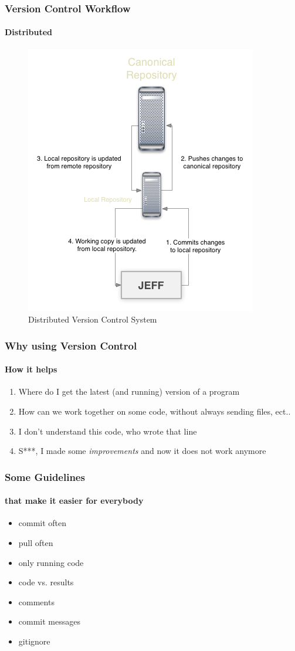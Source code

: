 \documentclass{beamer}
\begin{document}
\begin{frame}
    \frametitle{Version Control Workflow}
    \framesubtitle{Distributed}
    \begin{figure}[h]
        \centering
            \includegraphics[height=0.8\textheight]{dscm.png}
        \caption{Distributed Version Control System}
        \label{sg:fig:scm_simple}
    \end{figure}
\end{frame}


\begin{frame}
	\frametitle{Why using Version Control}
	\framesubtitle{How it helps}
	
	\begin{enumerate}
		\item<1-> Where do I get the latest (and running) version of a program
		\item<2-> How can we work together on some code, without always sending files, ect..
		\item<3-> I don't understand this code, who wrote that line
		\item<4-> S***, I made some \emph{improvements} and now it does not work anymore 
	\end{enumerate}
	
\end{frame}

\begin{frame}
	\frametitle{Some Guidelines}
	\framesubtitle{that make it easier for everybody}
	\begin{itemize}
		\item<1->commit often
		\item<2->pull often
		\item<3->only running code
		\item<4->code vs. results
		\item<5-> comments
		\item<6-> commit messages
		\item<7-> gitignore 
	\end{itemize}
\end{frame}
\end{document}
